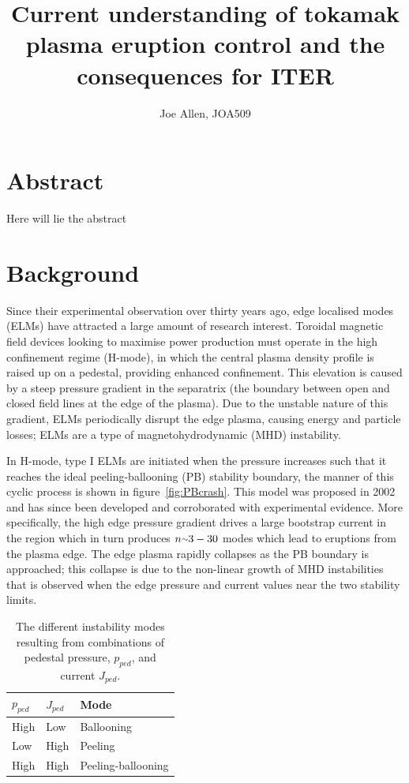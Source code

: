 \documentclass[12pt]{article}  %
\providecommand{\squiggle}{\raise.17ex\hbox{$\scriptstyle\sim$}} %
\begin{document}
\title{Current understanding of tokamak plasma eruption control and the consequences for ITER}
\author{Joe Allen, JOA509}
\maketitle

\section{Abstract}
Here will lie the abstract

\section{Background}\label{sec:Bg}
Since their experimental observation over thirty years ago\cite{Keilhacker1984}, edge localised modes (ELMs) have attracted a large amount of research interest. Toroidal magnetic field devices looking to maximise power production must operate in the high confinement regime (H-mode), in which the central plasma density profile is raised up on a pedestal, providing enhanced confinement.\cite{Wagner2007} This elevation is caused by a steep pressure gradient in the separatrix (the boundary between open and closed field lines at the edge of the plasma). Due to the unstable nature of this gradient, ELMs periodically disrupt the edge plasma, causing energy and particle losses; ELMs are a type of magnetohydrodynamic (MHD) instability.\cite{Zohm1996}

In H-mode, type I ELMs are initiated when the pressure increases such that it reaches the ideal peeling-ballooning (PB) stability boundary, the manner of this cyclic process is shown in figure~\ref{fig:PBcrash}. This model was proposed in 2002\cite{Snyder2002} and has since been developed and corroborated with experimental evidence.\cite{Wilson2002} More specifically, the high edge pressure gradient drives a large bootstrap current in the region which in turn produces $n\squiggle 3-30$ modes\cite{Snyder2009} which lead to eruptions from the plasma edge. The edge plasma rapidly collapses as the PB boundary is approached; this collapse is due to the non-linear growth of MHD instabilities \cite{Wilson2004} that is observed when the edge pressure and current values near the two stability limits.


\begin{table}[h]
\centering
\caption{The different instability modes resulting from combinations of pedestal pressure, $p_{ped}$, and current $J_{ped}$.\cite{Lang2013}}
\label{tab:PB}
\begin{tabular}{lll}
\hline
\textbf{$p_{ped}$}   & \textbf{$J_{ped}$} & \textbf{Mode} \\ \hline
   High      &    Low     &  Ballooning \\
   Low       &    High    &  Peeling    \\
   High      &    High    &  Peeling-ballooning
\end{tabular}
\end{table}
\end{document}
